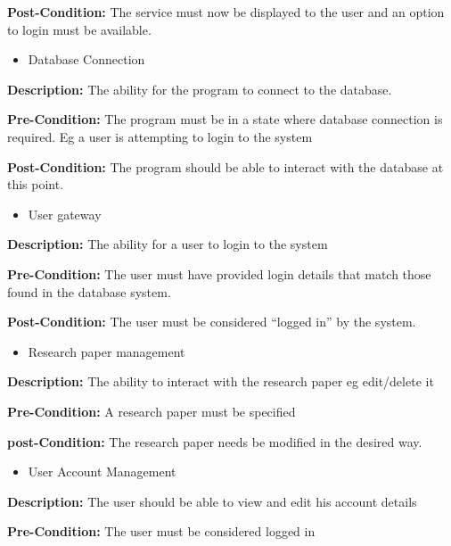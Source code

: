 \documentclass[11pt]{article}
\begin{document}
{\raggedright
	\textbf{Post-Condition:} The service must now be displayed to the user and an
	option to login must be available.
}

\begin{itemize}
	\item Database Connection
\end{itemize}

{\raggedright
	\textbf{Description: }The ability for the program to connect to the database.
}

{\raggedright
	\textbf{Pre-Condition: }The program must be in a state where database connection
	is required. Eg a user is attempting to login to the system
}

{\raggedright
	\textbf{Post-Condition: }The program should be able to interact with the
	database at this point.
}

\begin{itemize}
	\item User gateway
\end{itemize}

{\raggedright
	\textbf{Description: }The ability for a user to login to the system
}

{\raggedright
	\textbf{Pre-Condition: }The user must have provided login details that match
	those found in the database system.
}

{\raggedright
	\textbf{Post-Condition: }The user must be considered “logged in” by the system.
}

\begin{itemize}
	\item Research paper management
\end{itemize}

{\raggedright
	\textbf{Description: }The ability to interact with the research paper eg
	edit/delete it
}

{\raggedright
	\textbf{Pre-Condition: }A research paper must be specified
}

{\raggedright
	\textbf{post-Condition: }The research paper needs be modified in the desired
	way.
}

\begin{itemize}
	\item User Account Management
\end{itemize}

{\raggedright
	\textbf{Description: }The user should be able to view and edit his account details
}

{\raggedright
	\textbf{Pre-Condition: }The user must be considered logged in
}
\end{document}
